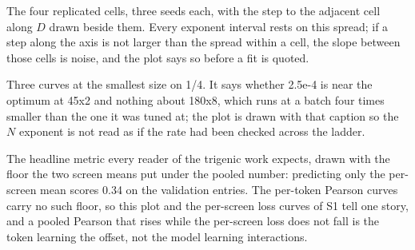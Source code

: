 The four replicated cells, three seeds each, with the step to the adjacent cell
along $D$ drawn beside them. Every exponent interval rests on this spread; if a
step along the axis is not larger than the spread within a cell, the slope
between those cells is noise, and the plot says so before a fit is quoted.

Three curves at the smallest size on 1/4. It says whether 2.5e-4 is near the
optimum at 45x2 and nothing about 180x8, which runs at a batch four times
smaller than the one it was tuned at; the plot is drawn with that caption so
the $N$ exponent is not read as if the rate had been checked across the ladder.

The headline metric every reader of the trigenic work expects, drawn with the
floor the two screen means put under the pooled number: predicting only the
per-screen mean scores 0.34 on the validation entries. The per-token Pearson
curves carry no such floor, so this plot and the per-screen loss curves of S1
tell one story, and a pooled Pearson that rises while the per-screen loss does
not fall is the token learning the offset, not the model learning interactions.
